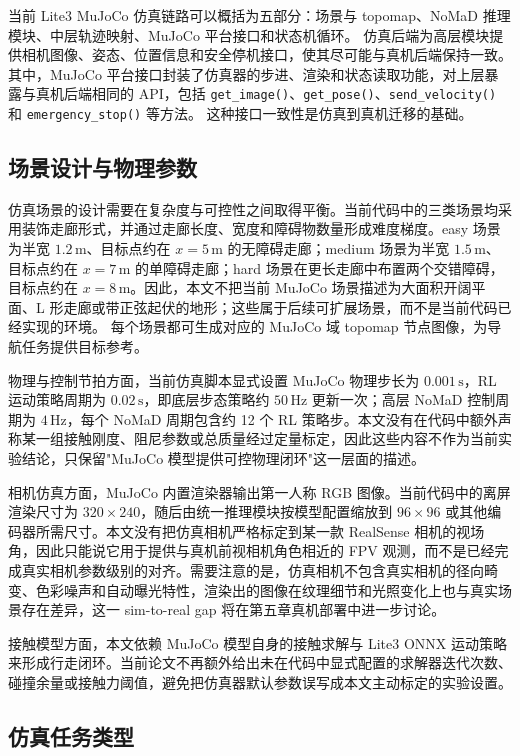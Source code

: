 当前 Lite3 MuJoCo 仿真链路可以概括为五部分：场景与 topomap、NoMaD 推理模块、中层轨迹映射、MuJoCo 平台接口和状态机循环。
仿真后端为高层模块提供相机图像、姿态、位置信息和安全停机接口，使其尽可能与真机后端保持一致。其中，MuJoCo 平台接口封装了仿真器的步进、渲染和状态读取功能，对上层暴露与真机后端相同的 API，包括 \texttt{get\_image()}、\texttt{get\_pose()}、\texttt{send\_velocity()} 和 \texttt{emergency\_stop()} 等方法。
这种接口一致性是仿真到真机迁移的基础。

\subsection{场景设计与物理参数}

仿真场景的设计需要在复杂度与可控性之间取得平衡。当前代码中的三类场景均采用装饰走廊形式，并通过走廊长度、宽度和障碍物数量形成难度梯度。easy 场景为半宽 $1.2\,\mathrm{m}$、目标点约在 $x=5\,\mathrm{m}$ 的无障碍走廊；medium 场景为半宽 $1.5\,\mathrm{m}$、目标点约在 $x=7\,\mathrm{m}$ 的单障碍走廊；hard 场景在更长走廊中布置两个交错障碍，目标点约在 $x=8\,\mathrm{m}$。因此，本文不把当前 MuJoCo 场景描述为大面积开阔平面、L 形走廊或带正弦起伏的地形；这些属于后续可扩展场景，而不是当前代码已经实现的环境。
每个场景都可生成对应的 MuJoCo 域 topomap 节点图像，为导航任务提供目标参考。

物理与控制节拍方面，当前仿真脚本显式设置 MuJoCo 物理步长为 $0.001\,\mathrm{s}$，RL 运动策略周期为 $0.02\,\mathrm{s}$，即底层步态策略约 $50\,\mathrm{Hz}$ 更新一次；高层 NoMaD 控制周期为 $4\,\mathrm{Hz}$，每个 NoMaD 周期包含约 12 个 RL 策略步。本文没有在代码中额外声称某一组接触刚度、阻尼参数或总质量经过定量标定，因此这些内容不作为当前实验结论，只保留"MuJoCo 模型提供可控物理闭环"这一层面的描述。

相机仿真方面，MuJoCo 内置渲染器输出第一人称 RGB 图像。当前代码中的离屏渲染尺寸为 $320 \times 240$，随后由统一推理模块按模型配置缩放到 $96\times96$ 或其他编码器所需尺寸。本文没有把仿真相机严格标定到某一款 RealSense 相机的视场角，因此只能说它用于提供与真机前视相机角色相近的 FPV 观测，而不是已经完成真实相机参数级别的对齐。需要注意的是，仿真相机不包含真实相机的径向畸变、色彩噪声和自动曝光特性，渲染出的图像在纹理细节和光照变化上也与真实场景存在差异，这一 sim-to-real gap 将在第五章真机部署中进一步讨论。

接触模型方面，本文依赖 MuJoCo 模型自身的接触求解与 Lite3 ONNX 运动策略来形成行走闭环。当前论文不再额外给出未在代码中显式配置的求解器迭代次数、碰撞余量或接触力阈值，避免把仿真器默认参数误写成本文主动标定的实验设置。

\subsection{仿真任务类型}

